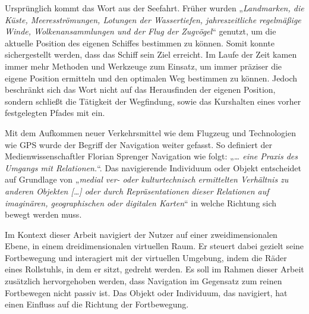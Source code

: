 Ursprünglich kommt das Wort aus der Seefahrt.
Früher wurden „\textit{Landmarken, die Küste, Meeresströmungen, Lotungen der Wassertiefen, jahreszeitliche regelmäßige Winde, Wolkenansammlungen und der Flug der Zugvögel}“\cite{wolfschmidtNavigareNecesseEst2008} genutzt, um die aktuelle Position des eigenen Schiffes bestimmen zu können.
Somit konnte sichergestellt werden, dass das Schiff sein Ziel erreicht.
Im Laufe der Zeit kamen immer mehr Methoden und Werkzeuge zum Einsatz, um immer präziser die eigene Position ermitteln und den optimalen Weg bestimmen zu können.
Jedoch beschränkt sich das Wort nicht auf das Herausfinden der eigenen Position, sondern schließt die Tätigkeit der Wegfindung, sowie das Kurshalten eines vorher festgelegten Pfades mit ein.

Mit dem Aufkommen neuer Verkehrsmittel wie dem Flugzeug und Technologien wie GPS wurde der Begriff der Navigation weiter gefasst.
So definiert der Medienwissenschaftler Florian Sprenger Navigation wie folgt: „\textit{… eine Praxis des Umgangs mit Relationen.}“\cite{sprengerNavigationenUndRelationen2022}.
Das navigierende Individuum oder Objekt entscheidet auf Grundlage von „\textit{medial ver- oder kulturtechnisch ermittelten Verhältnis zu anderen Objekten […] oder durch Repräsentationen dieser Relationen auf imaginären, geographischen oder digitalen Karten}“ in welche Richtung sich bewegt werden muss\cite{sprengerNavigationenUndRelationen2022}.

Im Kontext dieser Arbeit navigiert der Nutzer auf einer zweidimensionalen Ebene, in einem dreidimensionalen virtuellen Raum.
Er steuert dabei gezielt seine Fortbewegung und interagiert mit der virtuellen Umgebung, indem die Räder eines Rollstuhls, in dem er sitzt, gedreht werden.
Es soll im Rahmen dieser Arbeit zusätzlich hervorgehoben werden, dass Navigation im Gegensatz zum reinen Fortbewegen nicht passiv ist.
Das Objekt oder Individuum, das navigiert, hat einen Einfluss auf die Richtung der Fortbewegung.


